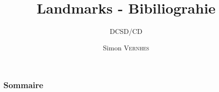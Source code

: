 \documentclass{beamer}
\title{Landmarks - Bibiliograhie}
\subtitle{\footnotesize DCSD/CD}
\author{{\Large Simon \textsc{Vernhes}}}
\institute{\textsc{{\large Onera}}}
\date{\oldstylenums{\today}}
\begin{document}
	\begin{frame}
		\titlepage
	\end{frame}

	\begin{frame}
		\frametitle{Sommaire}
		\small \tableofcontents
	\end{frame}

  
  
  
\end{document}
